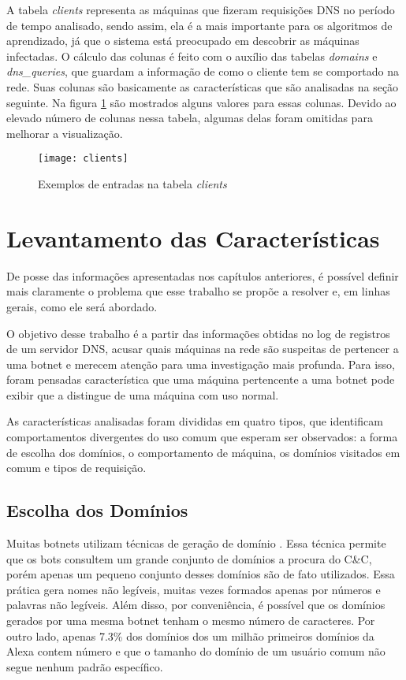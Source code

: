 A tabela \textit{clients} representa as máquinas que fizeram requisições DNS no período de tempo analisado, sendo assim, ela é a mais importante para os algoritmos de aprendizado, já que o sistema está preocupado em descobrir as máquinas infectadas. O cálculo das colunas é feito com o auxílio das tabelas \textit{domains} e \textit{dns\_queries}, que guardam a informação de como o cliente tem se comportado na rede. Suas colunas são basicamente as características que são analisadas na seção seguinte. Na figura \ref{fig:clients} são mostrados alguns valores para essas colunas. Devido ao elevado número de colunas nessa tabela, algumas delas foram omitidas para melhorar a visualização.

\begin{figure}
\texttt{[image: clients]}
\caption[Exemplos de entradas na tabela \textit{clients}]{Exemplos de entradas na tabela \textit{clients}} \label{fig:clients}
\end{figure}

\section{Levantamento das Características}
De posse das informações apresentadas nos capítulos anteriores, é possível definir mais claramente o problema que esse trabalho se propõe a resolver e, em linhas gerais, como ele será abordado.

O objetivo desse trabalho é a partir das informações obtidas no log de registros de um servidor DNS, acusar quais máquinas na rede são suspeitas de pertencer a uma botnet e merecem atenção para uma investigação mais profunda. Para isso, foram pensadas característica que uma máquina pertencente a uma botnet pode exibir que a distingue de uma máquina com uso normal.

As características analisadas foram divididas em quatro tipos, que identificam comportamentos divergentes do uso comum que esperam ser observados: a forma de escolha dos domínios, o comportamento de máquina, os domínios visitados em comum e tipos de requisição.

\subsection{Escolha dos Domínios}
Muitas botnets utilizam técnicas de geração de domínio \citep{zhou2013dga}. Essa técnica permite que os bots consultem um grande conjunto de domínios a procura do C\&C, porém apenas um pequeno conjunto desses domínios são de fato utilizados. Essa prática gera nomes não legíveis, muitas vezes formados apenas por números e palavras não legíveis. Além disso, por conveniência, é possível que os domínios gerados por uma mesma botnet tenham o mesmo número de caracteres. Por outro lado, apenas 7.3\% dos domínios dos um milhão primeiros domínios da Alexa contem número e que o tamanho do domínio de um usuário comum não segue nenhum padrão específico.

